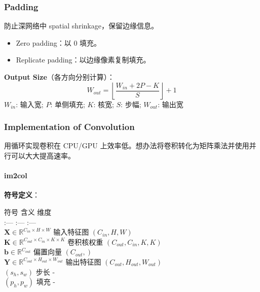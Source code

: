 \subsubsection{Padding}\label{padding}

  防止深网络中 spatial
  shrinkage，保留边缘信息。

\begin{itemize}
\tightlist
\item
  Zero padding：以 0 填充。
\item
  Replicate padding：以边缘像素复制填充。
\end{itemize}

\textbf{Output Size}（各方向分别计算）：
\[
W_{out} = \left\lfloor \frac{W_{in} + 2P - K}{S} \right\rfloor + 1
\]
{\scriptsize $W_{in}$: 输入宽; $P$: 单侧填充; $K$: 核宽; $S$: 步幅; $W_{out}$: 输出宽}

\subsubsection{Implementation of
Convolution}\label{implementation-of-convolution}

用循环实现卷积在 CPU/GPU
上效率低。想办法将卷积转化为矩阵乘法并使用并行可以大大提高速率。

\paragraph{im2col}\label{im2col}

\textbf{符号定义}：

符号 \textbar{} 含义 \textbar{} 维度 \textbar{}\\
:--- \textbar{} :--- \textbar{} :--- \textbar{}\\
\(\mathbf{X} \in \mathbb{R}^{C_{in} \times H \times W}\) \textbar{}
输入特征图 \textbar{} \((C_{in}, H, W)\) \textbar{}\\
\(\mathbf{K} \in \mathbb{R}^{C_{out} \times C_{in} \times K \times K}\)
\textbar{} 卷积核权重 \textbar{} \((C_{out}, C_{in}, K, K)\)
\textbar{}\\
\(\mathbf{b} \in \mathbb{R}^{C_{out}}\) \textbar{} 偏置向量 \textbar{}
\((C_{out},)\) \textbar{}\\
\(\mathbf{Y} \in \mathbb{R}^{C_{out} \times H_{out} \times W_{out}}\)
\textbar{} 输出特征图 \textbar{} \((C_{out}, H_{out}, W_{out})\)
\textbar{}\\
\((s_h, s_w)\) \textbar{} 步长 \textbar{} - \textbar{}\\
\((p_h, p_w)\) \textbar{} 填充 \textbar{} - \textbar{}

